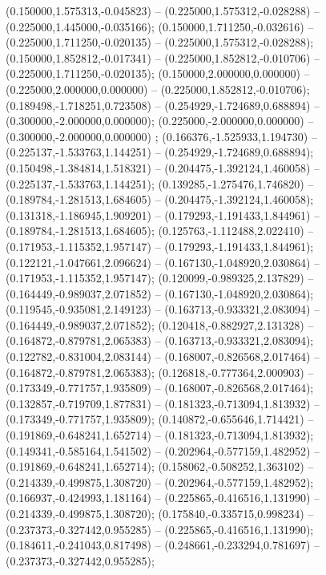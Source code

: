  (0.150000,1.575313,-0.045823) -- (0.225000,1.575312,-0.028288) -- (0.225000,1.445000,-0.035166);
 (0.150000,1.711250,-0.032616) -- (0.225000,1.711250,-0.020135) -- (0.225000,1.575312,-0.028288);
 (0.150000,1.852812,-0.017341) -- (0.225000,1.852812,-0.010706) -- (0.225000,1.711250,-0.020135);
 (0.150000,2.000000,0.000000) -- (0.225000,2.000000,0.000000) -- (0.225000,1.852812,-0.010706);
 (0.189498,-1.718251,0.723508) -- (0.254929,-1.724689,0.688894) -- (0.300000,-2.000000,0.000000);
 (0.225000,-2.000000,0.000000) -- (0.300000,-2.000000,0.000000) ;
 (0.166376,-1.525933,1.194730) -- (0.225137,-1.533763,1.144251) -- (0.254929,-1.724689,0.688894);
 (0.150498,-1.384814,1.518321) -- (0.204475,-1.392124,1.460058) -- (0.225137,-1.533763,1.144251);
 (0.139285,-1.275476,1.746820) -- (0.189784,-1.281513,1.684605) -- (0.204475,-1.392124,1.460058);
 (0.131318,-1.186945,1.909201) -- (0.179293,-1.191433,1.844961) -- (0.189784,-1.281513,1.684605);
 (0.125763,-1.112488,2.022410) -- (0.171953,-1.115352,1.957147) -- (0.179293,-1.191433,1.844961);
 (0.122121,-1.047661,2.096624) -- (0.167130,-1.048920,2.030864) -- (0.171953,-1.115352,1.957147);
 (0.120099,-0.989325,2.137829) -- (0.164449,-0.989037,2.071852) -- (0.167130,-1.048920,2.030864);
 (0.119545,-0.935081,2.149123) -- (0.163713,-0.933321,2.083094) -- (0.164449,-0.989037,2.071852);
 (0.120418,-0.882927,2.131328) -- (0.164872,-0.879781,2.065383) -- (0.163713,-0.933321,2.083094);
 (0.122782,-0.831004,2.083144) -- (0.168007,-0.826568,2.017464) -- (0.164872,-0.879781,2.065383);
 (0.126818,-0.777364,2.000903) -- (0.173349,-0.771757,1.935809) -- (0.168007,-0.826568,2.017464);
 (0.132857,-0.719709,1.877831) -- (0.181323,-0.713094,1.813932) -- (0.173349,-0.771757,1.935809);
 (0.140872,-0.655646,1.714421) -- (0.191869,-0.648241,1.652714) -- (0.181323,-0.713094,1.813932);
 (0.149341,-0.585164,1.541502) -- (0.202964,-0.577159,1.482952) -- (0.191869,-0.648241,1.652714);
 (0.158062,-0.508252,1.363102) -- (0.214339,-0.499875,1.308720) -- (0.202964,-0.577159,1.482952);
 (0.166937,-0.424993,1.181164) -- (0.225865,-0.416516,1.131990) -- (0.214339,-0.499875,1.308720);
 (0.175840,-0.335715,0.998234) -- (0.237373,-0.327442,0.955285) -- (0.225865,-0.416516,1.131990);
 (0.184611,-0.241043,0.817498) -- (0.248661,-0.233294,0.781697) -- (0.237373,-0.327442,0.955285);
